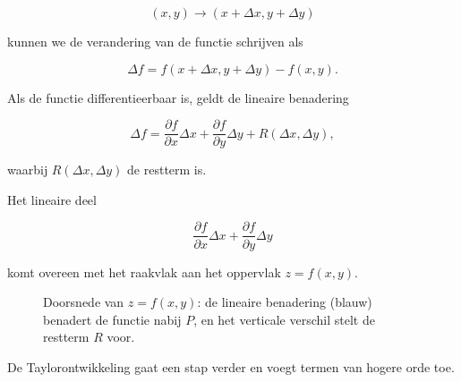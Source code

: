 \documentclass[11pt,a4paper]{article}
\begin{document}
    \[
        (x,y) \rightarrow (x+\Delta x, y+\Delta y)
    \]

    kunnen we de verandering van de functie schrijven als

    \[
        \Delta f
        =
        f(x+\Delta x, y+\Delta y) - f(x,y).
    \]

    Als de functie differentieerbaar is, geldt de lineaire benadering

    \[
        \Delta f
        =
        \frac{\partial f}{\partial x}\Delta x
        +
        \frac{\partial f}{\partial y}\Delta y
        +
        R(\Delta x,\Delta y),
    \]

    waarbij $R(\Delta x,\Delta y)$ de restterm is.

    Het lineaire deel

    \[
        \frac{\partial f}{\partial x}\Delta x
        +
        \frac{\partial f}{\partial y}\Delta y
    \]

    komt overeen met het raakvlak aan het oppervlak $z=f(x,y)$.

    \begin{figure}[htbp]
        \centering
        \caption{Doorsnede van $z=f(x,y)$: de lineaire benadering (blauw) benadert de functie nabij $P$, en het verticale verschil stelt de restterm $R$ voor.}
        \label{fig:lineaire-benadering-restterm}
    \end{figure}

    De Taylorontwikkeling gaat een stap verder en voegt termen van hogere orde toe.
\end{document}
